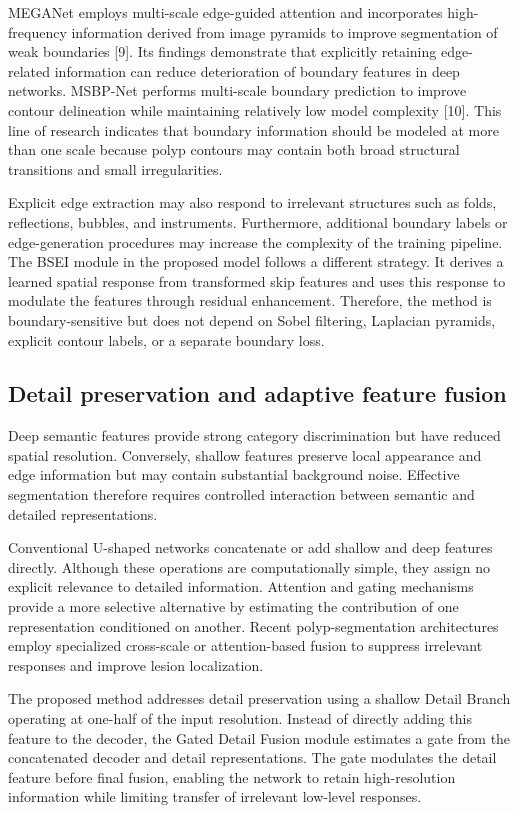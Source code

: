MEGANet employs multi-scale edge-guided attention and incorporates
high-frequency information derived from image pyramids to improve
segmentation of weak boundaries {[}9{]}. Its findings demonstrate that
explicitly retaining edge-related information can reduce deterioration
of boundary features in deep networks. MSBP-Net performs multi-scale
boundary prediction to improve contour delineation while maintaining
relatively low model complexity {[}10{]}. This line of research
indicates that boundary information should be modeled at more than one
scale because polyp contours may contain both broad structural
transitions and small irregularities.

Explicit edge extraction may also respond to irrelevant structures such
as folds, reflections, bubbles, and instruments. Furthermore, additional
boundary labels or edge-generation procedures may increase the
complexity of the training pipeline. The BSEI module in the proposed
model follows a different strategy. It derives a learned spatial
response from transformed skip features and uses this response to
modulate the features through residual enhancement. Therefore, the
method is boundary-sensitive but does not depend on Sobel filtering,
Laplacian pyramids, explicit contour labels, or a separate boundary
loss.

\subsection{Detail preservation and adaptive feature
fusion}\label{detail-preservation-and-adaptive-feature-fusion}

Deep semantic features provide strong category discrimination but have
reduced spatial resolution. Conversely, shallow features preserve local
appearance and edge information but may contain substantial background
noise. Effective segmentation therefore requires controlled interaction
between semantic and detailed representations.

Conventional U-shaped networks concatenate or add shallow and deep
features directly. Although these operations are computationally simple,
they assign no explicit relevance to detailed information. Attention and
gating mechanisms provide a more selective alternative by estimating the
contribution of one representation conditioned on another. Recent
polyp-segmentation architectures employ specialized cross-scale or
attention-based fusion to suppress irrelevant responses and improve
lesion localization.

The proposed method addresses detail preservation using a shallow Detail
Branch operating at one-half of the input resolution. Instead of
directly adding this feature to the decoder, the Gated Detail Fusion
module estimates a gate from the concatenated decoder and detail
representations. The gate modulates the detail feature before final
fusion, enabling the network to retain high-resolution information while
limiting transfer of irrelevant low-level responses.

